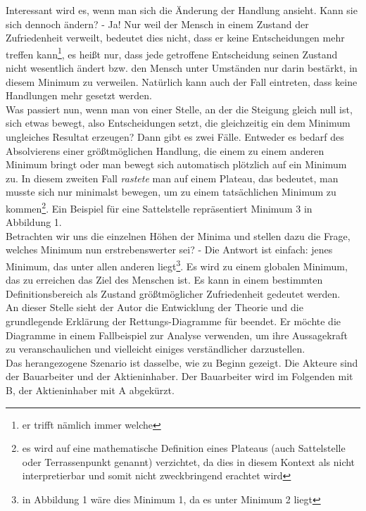 \documentclass[12pt,a4paper,oneside]{article}
\begin{document}
  Interessant wird es, wenn man sich die Änderung der Handlung ansieht. Kann sie sich dennoch ändern? - Ja! Nur weil der Mensch in einem Zustand der Zufriedenheit verweilt, bedeutet dies nicht, dass er keine Entscheidungen mehr treffen kann\footnote{er trifft nämlich immer welche}, es heißt nur, dass jede getroffene Entscheidung seinen Zustand nicht wesentlich ändert bzw. den Mensch unter Umständen nur darin bestärkt, in diesem Minimum zu verweilen. Natürlich kann auch der Fall eintreten, dass keine Handlungen mehr gesetzt werden.\\
  
  Was passiert nun, wenn man von einer Stelle, an der die Steigung gleich null ist, sich etwas bewegt, also Entscheidungen setzt, die gleichzeitig ein dem Minimum ungleiches Resultat erzeugen? Dann gibt es zwei Fälle. Entweder es bedarf des Absolvierens einer größtmöglichen Handlung, die einem zu einem anderen Minimum bringt oder man bewegt sich automatisch plötzlich auf ein Minimum zu. In diesem zweiten Fall \textit{rastete} man auf einem Plateau, das bedeutet, man musste sich nur minimalst bewegen, um zu einem tatsächlichen Minimum zu kommen\footnote{es wird auf eine mathematische Definition eines Plateaus (auch Sattelstelle oder Terrassenpunkt genannt) verzichtet, da dies in diesem Kontext als nicht interpretierbar und somit nicht zweckbringend erachtet wird}. Ein Beispiel für eine Sattelstelle repräsentiert Minimum 3 in Abbildung 1. \\
  
  Betrachten wir uns die einzelnen Höhen der Minima und stellen dazu die Frage, welches Minimum nun erstrebenswerter sei? - Die Antwort ist einfach: jenes Minimum, das unter allen anderen liegt\footnote{in Abbildung 1 wäre dies Minimum 1, da es unter Minimum 2 liegt}. Es wird zu einem globalen Minimum, das zu erreichen das Ziel des Menschen ist. Es kann in einem bestimmten Definitionsbereich als Zustand größtmöglicher Zufriedenheit gedeutet werden. \\
  
  An dieser Stelle sieht der Autor die Entwicklung der Theorie und die grundlegende Erklärung der Rettungs-Diagramme für beendet. Er möchte die Diagramme in einem Fallbeispiel zur Analyse verwenden, um ihre Aussagekraft zu veranschaulichen und vielleicht einiges verständlicher darzustellen. \\
  
   Das herangezogene Szenario ist dasselbe, wie zu Beginn gezeigt. Die Akteure sind der Bauarbeiter und der Aktieninhaber. Der Bauarbeiter wird im Folgenden mit B, der Aktieninhaber mit A abgekürzt.
   
\end{document}
